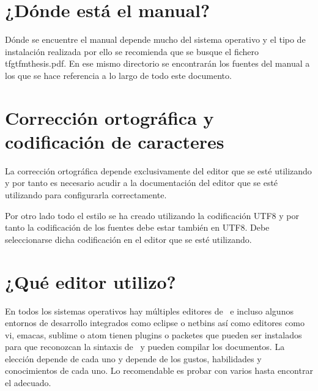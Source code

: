 \section{¿Dónde está el manual?}

Dónde se encuentre el manual depende mucho del sistema operativo y el tipo de instalación realizada por ello se recomienda que se busque el fichero tfgtfmthesis.pdf. En ese mismo directorio se encontrarán los fuentes del manual a los que se hace referencia a lo largo de todo este documento.

\section{Corrección ortográfica y codificación de caracteres}

La corrección ortográfica depende exclusivamente del editor que se esté utilizando y por tanto es necesario acudir a la documentación del editor que se esté utilizando para configurarla correctamente.

Por otro lado todo el estilo se ha creado utilizando la codificación UTF8 y por tanto la codificación de los fuentes debe estar también en UTF8. Debe seleccionarse dicha codificación en el editor que se esté utilizando.

\section{¿Qué editor utilizo?}

En todos los sistemas operativos hay múltiples editores de \LaTeXe\ e incluso algunos entornos de desarrollo integrados como eclipse o netbins así como editores como vi, emacas, sublime o atom tienen plugins o packetes que pueden ser instalados para que reconozcan la sintaxis de \LaTeXe\ y pueden compilar los documentos. La elección depende de cada uno y depende de los gustos, habilidades y conocimientos de cada uno. Lo recomendable es probar con varios hasta encontrar el adecuado.
